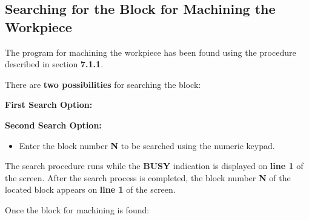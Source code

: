 \subsection{Searching for the Block for Machining the Workpiece}

The program for machining the workpiece has been found using the procedure described in section \textbf{7.1.1}.

There are \textbf{two possibilities} for searching the block:

\vspace{.5cm}

\textbf{First Search Option:}

\begin{itemize}
\end{itemize}

\begin{itemize}
\end{itemize}

\vspace{.5cm}

\textbf{Second Search Option:}

\begin{itemize}
    \item Enter the block number \textbf{N} to be searched using the numeric keypad.
\end{itemize}

\begin{itemize}
\end{itemize}
\vspace{.5cm}
\begin{itemize}
\end{itemize}

The search procedure runs while the \textbf{BUSY} indication is displayed on \textbf{line 1} of the screen.  
After the search process is completed, the block number \textbf{N} of the located block appears on \textbf{line 1} of the screen.

Once the block for machining is found:

\begin{itemize}
\end{itemize}

